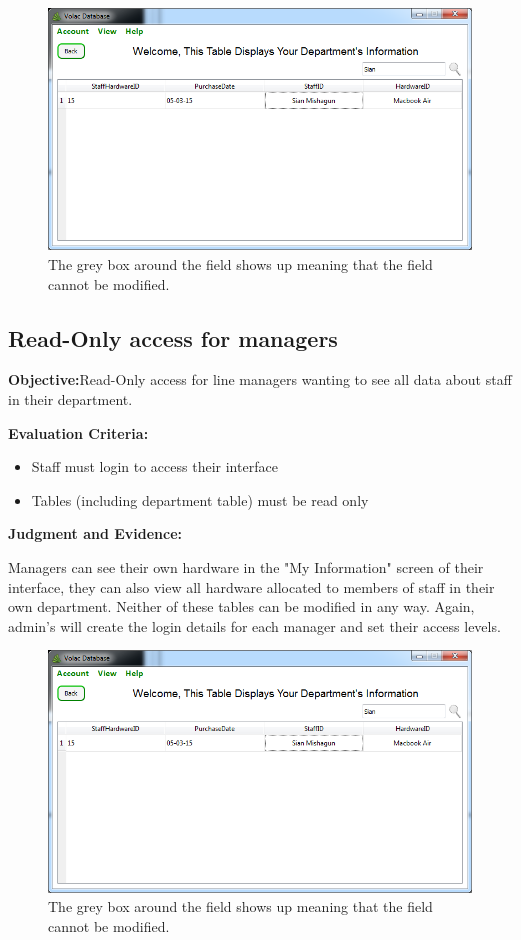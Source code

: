 \begin{figure}[H]
    \includegraphics[width=\textwidth]{./Evaluation/Images/readonlymanager.png}
    \caption{The grey box around the field shows up meaning that the field cannot be modified.} 
\end{figure}

\subsection{Read-Only access for managers}

\textbf{Objective:}Read-Only access for line managers wanting to see all data about staff in their department.

\textbf{Evaluation Criteria:}
\begin{itemize}
\item{Staff must login to access their interface}
\item{Tables (including department table) must be read only}
\end{itemize}

\textbf{Judgment and Evidence:}

Managers can see their own hardware in the "My Information" screen of their interface, they can also view all hardware allocated to members of staff in their own department. Neither of these tables can be modified in any way. Again, admin's will create the login details for each manager and set their access levels.
\begin{figure}[H]
    \includegraphics[width=\textwidth]{./Evaluation/Images/readonlymanager.png}
    \caption{The grey box around the field shows up meaning that the field cannot be modified.} 
\end{figure}

